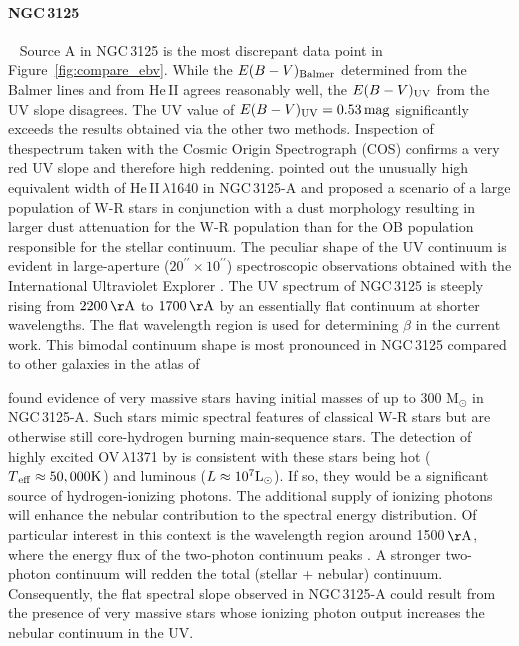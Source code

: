 \documentclass[]{aastex63}
\begin{document}
\paragraph{NGC\,3125~}~
Source A in NGC\,3125 is the most discrepant data point in Figure~\ref{fig:compare_ebv}. While the ${E(B-V)_{\rm Balmer}}$ determined from the Balmer lines and from He\,II agrees reasonably well, the ${E(B-V)_{\rm UV}}$ from the UV slope disagrees. The UV value of $E(B-V)_{\rm UV} = 0.53\,{\rm mag}$ significantly exceeds the results obtained via the other two methods. Inspection of thespectrum taken with the Cosmic Origin Spectrograph (COS) confirms a very red UV slope and therefore high reddening. \citet{chandar_ngc_2004} pointed out the unusually high equivalent width of He\,II\,$\lambda$1640 in NGC\,3125-A and proposed a scenario of a large population of W-R stars in conjunction with a dust morphology resulting in larger dust attenuation for the W-R population than for the OB population responsible for the stellar continuum. The peculiar shape of the UV continuum is evident in large-aperture ($20^{\prime\prime} \times 10^{\prime\prime}$) spectroscopic observations obtained with the International Ultraviolet Explorer \citep{kinney_atlas_1993}. The UV spectrum of NGC\,3125 is steeply rising from $2200\,{\rm \AA}$ to $1700\,{\rm \AA}$ by an essentially flat continuum at shorter wavelengths. The flat wavelength region is used for determining $\beta$ in the current work. This bimodal continuum shape is most pronounced in NGC\,3125 compared to other galaxies in the atlas of \citep{kinney_atlas_1993}

\citet{wofford_extreme_2023} found evidence of very massive stars having initial masses of up to 300 M$_{\odot}$ in NGC\,3125-A. Such stars mimic spectral features of classical W-R stars but are otherwise still core-hydrogen burning main-sequence stars. The detection of highly excited OV\,$\lambda$1371 by \citet{wofford_extreme_2023} is consistent with these stars being hot ($T{\rm _{eff} \approx 50, 000 K}$) and luminous ($L \approx 10^7 {\rm L_{\odot}}$). If so, they would be a significant source of hydrogen-ionizing photons. The additional supply of ionizing photons will enhance the nebular contribution to the spectral energy distribution. Of particular interest in this context is the wavelength region around 1500\,${\rm \AA}$, where the energy flux of the two-photon continuum peaks \citep{johnstone_hydrogen_2012}. A stronger two-photon continuum will redden the total (stellar + nebular) continuum. Consequently, the flat spectral slope observed in NGC\,3125-A could result from the presence of very massive stars whose ionizing photon output increases the nebular continuum in the UV.
\end{document}
